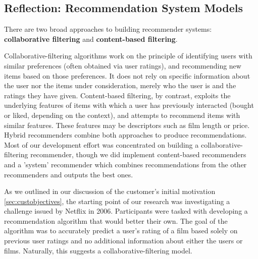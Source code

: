 \documentclass{l3proj}
\begin{document}
\subsection{Reflection: Recommendation System Models}
\label{sec:modelreflection}

There are two broad approaches to building recommender systems: \textbf{collaborative filtering} and \textbf{content-based filtering}. 

Collaborative-filtering algorithms work on the principle of identifying users with similar preferences (often obtained via user ratings), and recommending new items based on those preferences. It does not rely on specific information about the user nor the items under consideration, merely who the user is and the ratings they have given. Content-based filtering, by contrast, exploits the underlying features of items with which a user has previously interacted (bought or liked, depending on the context), and attempts to recommend items with similar features. These features may be descriptors such as film length or price. Hybrid recommenders combine both approaches to produce recommendations. Most of our development effort was concentrated on building a collaborative-filtering recommender, though we did implement content-based recommenders and a 'system' recommender which combines recommendations from the other recommenders and outputs the best ones. 

As we outlined in our discussion of the customer’s initial motivation \ref{sec:custobjectives}, the starting point of our research was investigating a challenge issued by Netflix in 2006. Participants were tasked with developing a recommendation algorithm that would better their own. The goal of the algorithm was to accurately predict a user's rating of a film based solely on previous user ratings and no additional information about either the users or films. Naturally, this suggests a collaborative-filtering model.
\end{document}
